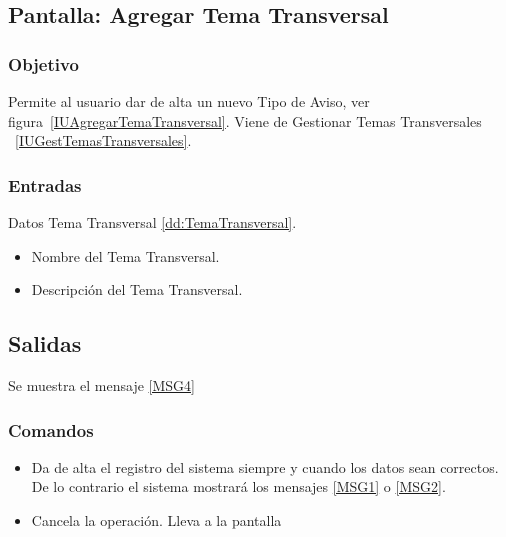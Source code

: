 \subsection{Pantalla: Agregar Tema Transversal}

\subsubsection{Objetivo}
Permite al usuario dar de alta un nuevo Tipo de Aviso, ver figura~\ref{IUAgregarTemaTransversal}. Viene de Gestionar Temas Transversales ~\ref{IUGestTemasTransversales}.


\subsubsection{Entradas}
Datos Tema Transversal \ref{dd:TemaTransversal}.
\begin{itemize}
 \item Nombre del Tema Transversal.
 \item Descripción del Tema Transversal.
\end{itemize}

\subsection{Salidas}
Se muestra el mensaje \ref{MSG4}
\subsubsection{Comandos}
\begin{itemize}
 \item {} Da de alta el registro del sistema siempre y cuando los datos sean correctos. De lo contrario el sistema mostrará los mensajes \ref{MSG1} o \ref{MSG2}.
 \item {} Cancela la operación. Lleva a la pantalla 

\end{itemize}



